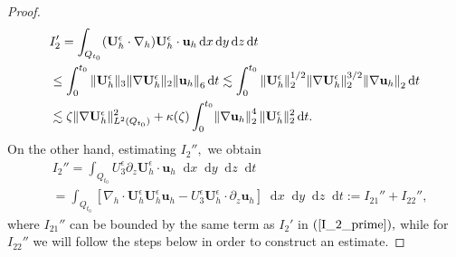 \documentclass[11pt, a4paper]{article}
\newcommand*\diff{\mathop{}\!\mathrm{d}}
\begin{document}
\begin{proof}
\begin{equation} \label{I_2_prime}
\begin{split}
& I_2'= \int_{Q_{t_0}} (\mathbf{U}^\epsilon_h \cdot \nabla_h) \mathbf{U}^\epsilon_h \cdot \mathbf{u}_h \diff x \diff y \diff z \diff t \\
& \leq \int_0^{t_0} \| \mathbf{U}^\epsilon_h \| _3 \| \nabla \mathbf{U}^\epsilon_h \| _2 \norm{\mathbf{u}_h}_6 \diff t \lesssim \int_0^{t_0} \| \mathbf{U}^\epsilon_h \| _2^{1/2} \| \nabla \mathbf{U}^\epsilon_h \|_2^{3/2} \norm{\nabla \mathbf{u}_h}_2 \diff t \\
& \lesssim \zeta \| \nabla \mathbf{U}^\epsilon_h \| ^2_{L^2(Q_{t_0})} + \kappa(\zeta) \int_0^{t_0} \norm{\nabla \mathbf{u}_h}_2^4 \| \mathbf{U}^\epsilon_h \| _2^2 \diff t.
\end{split}
\end{equation}
On the other hand, estimating $I_2'',$ we obtain
\begin{equation}
\begin{split}
& I_2 '' = \int_{Q_{t_0}} U^\epsilon_3 \partial_z \mathbf{U}_h^\epsilon \cdot \mathbf{u}_h \diff x \diff y \diff z \diff t \\
& = \int_{Q_{t_0}} [\nabla_h \cdot \mathbf{U}_h^\epsilon \mathbf{U}_h^\epsilon \mathbf{u}_h - U^\epsilon_3 \mathbf{U}_h^\epsilon \cdot \partial_z \mathbf{u}_h ] \diff x \diff y \diff z \diff t := I_{21}'' + I_{22}'',
\end{split}
\end{equation}
%
where $I_{21}''$ can be bounded by the same term as $I_2'$ in $(\ref{I_2_prime}),$ while for $I_{22}''$ we will follow the steps below in order to construct an estimate.


\end{proof}
\end{document}
